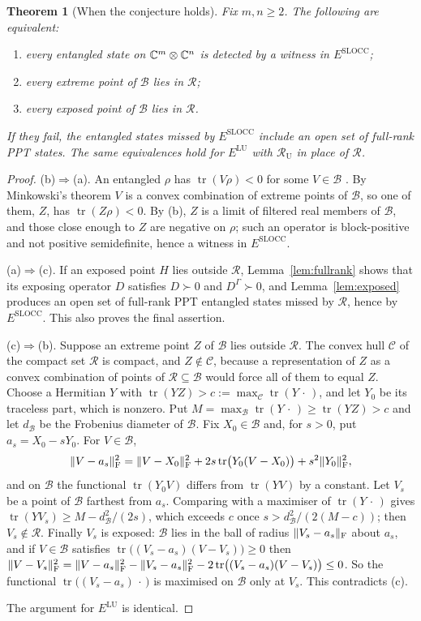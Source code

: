 \documentclass[11pt,a4paper]{article}
\newtheorem{theorem}{Theorem}\newtheorem{lemma}[theorem]{Lemma}\newtheorem{prop}[theorem]{Proposition}\newtheorem{cor}[theorem]{Corollary}
\theoremstyle{definition}\newtheorem{definition}[theorem]{Definition}\newtheorem*{conj}{Conjecture 9 of Shen, Chen and Bian}\newtheorem{remark}[theorem]{Remark}
\newcommand{\tr}{\operatorname{tr}}\newcommand{\im}{\operatorname{Im}}\newcommand{\adj}{\operatorname{adj}}\newcommand{\id}{\mathbb I}
\newcommand{\cB}{\mathcal B}\newcommand{\cR}{\mathcal R}\newcommand{\vecm}{\mathrm{vec}}
\begin{document}
\begin{theorem}[When the conjecture holds]\label{thm:dichotomy}
Fix $m,n\geq2$. The following are equivalent:
\begin{enumerate}
\item[(a)] every entangled state on $\mathbb C^m\otimes\mathbb C^n$ is detected by a witness in $E^{\mathrm{SLOCC}}$;
\item[(b)] every extreme point of $\cB$ lies in $\cR$;
\item[(c)] every exposed point of $\cB$ lies in $\cR$.
\end{enumerate}
If they fail, the entangled states missed by $E^{\mathrm{SLOCC}}$ include an open set of full-rank PPT states. The same equivalences hold for $E^{\mathrm{LU}}$ with $\cR_{\mathrm U}$ in place of $\cR$.
\end{theorem}
\begin{proof}
(b)$\Rightarrow$(a). An entangled $\rho$ has $\tr(V\rho)<0$ for some $V\in\cB$ \cite{horodecki}. By Minkowski's theorem $V$ is a convex combination of extreme points of $\cB$, so one of them, $Z$, has $\tr(Z\rho)<0$. By (b), $Z$ is a limit of filtered real members of $\cB$, and those close enough to $Z$ are negative on $\rho$; such an operator is block-positive and not positive semidefinite, hence a witness in $E^{\mathrm{SLOCC}}$.

(a)$\Rightarrow$(c). If an exposed point $H$ lies outside $\cR$, Lemma~\ref{lem:fullrank} shows that its exposing operator $D$ satisfies $D\succ0$ and $D^\Gamma\succ0$, and Lemma~\ref{lem:exposed} produces an open set of full-rank PPT entangled states missed by $\cR$, hence by $E^{\mathrm{SLOCC}}$. This also proves the final assertion.

(c)$\Rightarrow$(b). Suppose an extreme point $Z$ of $\cB$ lies outside $\cR$. The convex hull $\mathcal C$ of the compact set $\cR$ is compact, and $Z\notin\mathcal C$, because a representation of $Z$ as a convex combination of points of $\cR\subseteq\cB$ would force all of them to equal $Z$. Choose a Hermitian $Y$ with $\tr(YZ)>c:=\max_{\mathcal C}\tr(Y\,\cdot\,)$, and let $Y_0$ be its traceless part, which is nonzero. Put $M=\max_{\cB}\tr(Y\,\cdot\,)\geq\tr(YZ)>c$ and let $d_{\cB}$ be the Frobenius diameter of $\cB$. Fix $X_0\in\cB$ and, for $s>0$, put $a_s=X_0-sY_0$. For $V\in\cB$,
\[
 \|V-a_s\|_\F^2=\|V-X_0\|_\F^2+2s\tr\bigl(Y_0(V-X_0)\bigr)+s^2\|Y_0\|_\F^2 ,
\]
and on $\cB$ the functional $\tr(Y_0V)$ differs from $\tr(YV)$ by a constant. Let $V_s$ be a point of $\cB$ farthest from $a_s$. Comparing with a maximiser of $\tr(Y\,\cdot\,)$ gives $\tr(YV_s)\geq M-d_{\cB}^2/(2s)$, which exceeds $c$ once $s>d_{\cB}^2/(2(M-c))$; then $V_s\notin\cR$. Finally $V_s$ is exposed: $\cB$ lies in the ball of radius $\|V_s-a_s\|_\mathrm F$ about $a_s$, and if $V\in\cB$ satisfies $\tr\bigl((V_s-a_s)(V-V_s)\bigr)\geq0$ then
$\|V-V_s\|_\F^2=\|V-a_s\|_\F^2-\|V_s-a_s\|_\F^2-2\tr\bigl((V_s-a_s)(V-V_s)\bigr)\leq0$. So the functional $\tr\bigl((V_s-a_s)\,\cdot\,\bigr)$ is maximised on $\cB$ only at $V_s$. This contradicts (c).

The argument for $E^{\mathrm{LU}}$ is identical.
\end{proof}
\end{document}
